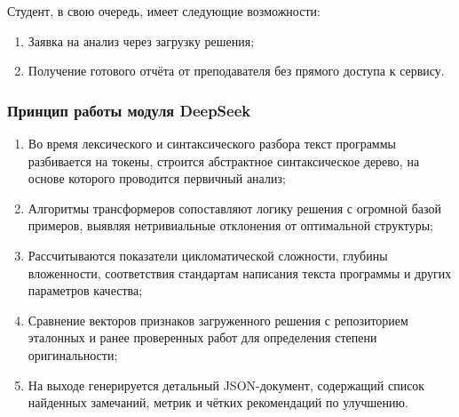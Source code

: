 Студент, в свою очередь, имеет следующие возможности:

\begin{enumerate}
    \item Заявка на анализ через загрузку решения;
    \item Получение готового отчёта от преподавателя без прямого доступа к сервису.
\end{enumerate}

\subsubsection{Принцип работы модуля DeepSeek}

\begin{enumerate}
  \item Во время лексического и синтаксического разбора текст программы разбивается на токены, строится абстрактное синтаксическое дерево, на основе которого проводится первичный анализ;
  \item Алгоритмы трансформеров сопоставляют логику решения с огромной базой примеров, выявляя нетривиальные отклонения от оптимальной структуры;
  \item Рассчитываются показатели цикломатической сложности, глубины вложенности, соответствия стандартам написания текста программы и других параметров качества;
  \item Сравнение векторов признаков загруженного решения с репозиторием эталонных и ранее проверенных работ для определения степени оригинальности;
  \item На выходе генерируется детальный JSON-документ, содержащий список найденных замечаний, метрик и чётких рекомендаций по улучшению.
\end{enumerate}
